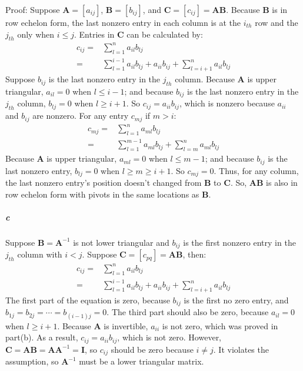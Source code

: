 \documentclass[22pt]{article}
\begin{document}
		Proof: Suppose $\mathbf{A} = [a_{ij}]$, $\mathbf{B} = [b_{ij}]$, and $\mathbf{C} = [c_{ij}]=\mathbf{AB}$. Because $\mathbf{B}$ is in row echelon form, the last nonzero entry in each column is at the $i_{th}$ row and the $j_{th}$ only when $i\leq j$. Entries in $\mathbf{C}$ can be calculated by:
		\begin{align}
			c_{ij} =& \sum\limits_{l=1}^{n}a_{il}b_{lj}\\
			=& \sum\limits_{l=1}^{i-1}a_{il}b_{lj} + a_{ii}b_{ij} + \sum\limits_{l=i+1}^{n}a_{il}b_{lj}
		\end{align}
		Suppose $b_{ij}$ is the last nonzero entry in the $j_{th}$ column. Because $\mathbf{A}$ is upper triangular, $a_{il} = 0$ when $l\leq i-1$; and because $b_{ij}$ is the last nonzero entry in the $j_{th}$ column, $b_{lj} = 0$ when $l\geq i+1$. So $c_{ij} = a_{ii}b_{ij}$, which is nonzero because $a_{ii}$ and $b_{ij}$ are nonzero. For any entry $c_{mj}$ if $m>i$:
		\begin{align}
			c_{mj} =& \sum\limits_{l=1}^{n}a_{ml}b_{lj}\\
			=& \sum\limits_{l=1}^{m-1}a_{ml}b_{lj} + \sum\limits_{l=m}^{n}a_{ml}b_{lj}
		\end{align}
		 Because $\mathbf{A}$ is upper triangular, $a_{ml} = 0$ when $l\leq m-1$; and because $b_{ij}$  is the last nonzero entry, $b_{lj} = 0$ when $l\geq m \geq i+1$. So $c_{mj} = 0$. Thus, for any column, the last nonzero entry's position doesn't changed from $\mathbf{B}$ to $\mathbf{C}$. So, $\mathbf{AB}$  is also in row echelon form with pivots in the same locations as $\mathbf{B}$.

		\subparagraph{c}  Suppose $\mathbf{B} = \mathbf{A}^{-1}$ is not lower triangular and $b_{ij}$ is the first nonzero entry in the $j_{th}$ column with $i<j$. Suppose $\mathbf{C} = [c_{pq}] = \mathbf{AB}$, then:
		\begin{align}
			c_{ij} = & \sum\limits_{l=1}^{n}a_{il}b_{lj}\\
			= &\sum\limits_{l=1}^{i-1} a_{il}b_{lj} + a_{ii}b_{ij} + \sum\limits_{l=i+1}^{n} a_{il}b_{lj} 
		\end{align}
		The first part of the equation is zero, because $b_{ij}$ is the first no zero entry, and $b_{1j} = b_{2j} = \cdots = b_{(i-1)j} =0$. The third part should also be zero, because $a_{il} = 0$ when $l\geq i+1$. Because $ \mathbf{A}$ is invertible, $a_{ii}$ is not zero, which was proved in part(b).  As a result, $c_{ij} = a_{ii}b_{ij}$, which is not zero. However, $\mathbf{C} = \mathbf{AB} = \mathbf{AA}^{-1} = \mathbf{I}$, so $c_{ij}$ should be zero because $i \not= j$. It violates the assumption, so $\mathbf{A}^{-1}$ must be a lower triangular matrix.
\end{document}
